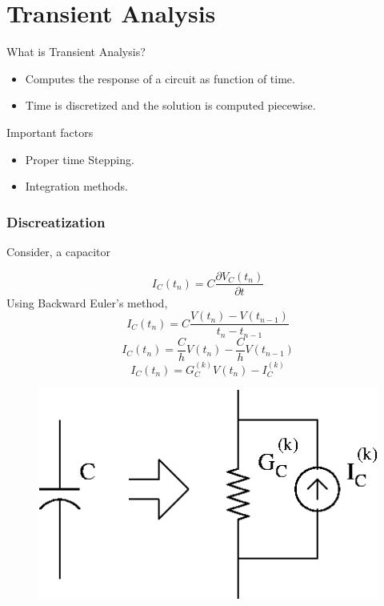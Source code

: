 \documentclass{beamer}
\begin{document}
\section{Transient Analysis}
\begin{frame}
  \begin{block}{What is Transient Analysis?}
     \begin{itemize}
       \item Computes the response of a circuit as function of time.
       \item Time is discretized and the solution is computed piecewise.
     \end{itemize}
   \end{block}
  \begin{block}{Important factors}
    \begin{itemize}
      \item Proper time Stepping.
      \item Integration methods.
    \end{itemize}
  \end{block}
\end{frame}

\begin{frame}
\frametitle{Discreatization}
Consider, a capacitor
\begin{tiny}
$$I_C(t_n)=C\frac{\partial{V}_C(t_n)}{\partial{t}}$$
Using Backward Euler's method,
$$I_C(t_n)=C\frac{V(t_n)-V(t_{n-1})}{t_n-t_{n-1}}$$
$$I_C(t_n)=\frac{C}{h}V(t_n)-\frac{C}{h}V(t_{n-1})$$
$$I_C(t_n)=G_C^{(k)}V(t_n)-I_C^{(k)}$$
\end{tiny}
\begin{figure}[h]
\centering
\includegraphics[scale=0.8]{../figures/Ceq.eps}
\end{figure}
\end{frame}
\end{document}
